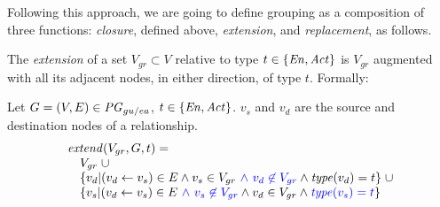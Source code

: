 Following this approach, we are going to define grouping as a composition of three functions: \textit{closure}, defined above, \textit{extension}, and \textit{replacement}, as follows.

%
The \textit{extension} of a set $V_{gr} \subset V$ relative to type $t \in \{ \mathit{En}, \mathit{Act} \}$ is $V_{gr}$ augmented with all its adjacent nodes, in either direction, of type $t$. %
Formally:





\vspace*{10pt}
\begin{definition}[$\extend$]
  \label{def:extend}
  Let $G = (V,E) \in \mathit{PG}_{gu/ea}$, $t \in \{ \mathit{En}, \mathit{Act} \}$. $v_s$ and $v_d$ are the source and destination nodes of a relationship.
\[
\begin{array}{l}
\extend(V_{gr}, G ,t) =  \\
\quad V_{gr} \;\cup \\ 
\quad    \{ v_d | (v_d \leftarrow v_s) \in E \wedge v_s \in V_{gr} \jwb{~\wedge\ v_d \nin V_{gr}} \wedge \type(v_d) = t \} \;\cup \\
\quad   \{ v_s | (v_d \leftarrow v_s) \in E  \jwb{~\wedge\ v_s \nin V_{gr}} \wedge v_d \in V_{gr}  \wedge \jwb{\type(v_s) = t} \}  \\
\end{array}
\]


\end{definition}

